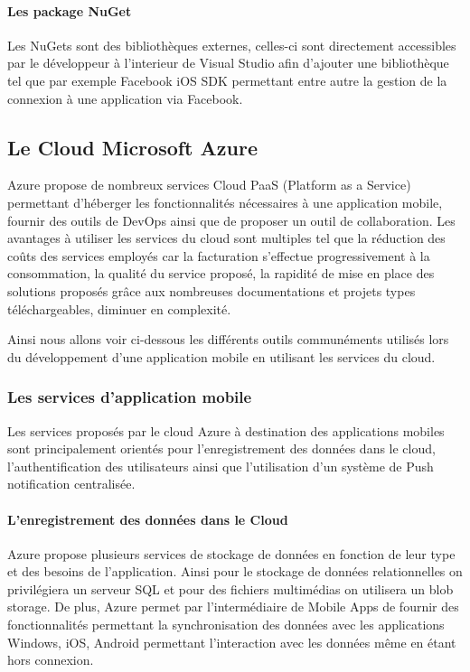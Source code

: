 \documentclass[11]{article}
\begin{document}
\paragraph{Les package NuGet}
Les NuGets sont des bibliothèques externes, celles-ci sont directement accessibles par le développeur à l’interieur de Visual Studio afin d’ajouter une bibliothèque tel que par exemple Facebook iOS SDK permettant entre autre la gestion de la connexion à une application via Facebook.





\subsection{Le Cloud Microsoft Azure}
Azure propose de nombreux services Cloud PaaS (Platform as a Service) permettant d’héberger les fonctionnalités nécessaires à une application mobile, fournir des outils de DevOps ainsi que de proposer un outil de collaboration. Les avantages à utiliser les services du cloud sont multiples tel que la réduction des coûts des services employés car la facturation s’effectue progressivement à la consommation, la qualité du service proposé, la rapidité de mise en place des solutions proposés grâce aux nombreuses documentations et projets types téléchargeables, diminuer en complexité. 
      
\vspace{0.5cm}
   
Ainsi nous allons voir ci-dessous les différents outils communéments utilisés lors du développement d’une application mobile en utilisant les services du cloud.


\subsubsection{Les services d'application mobile}
Les services proposés par le cloud Azure à destination des applications mobiles sont principalement orientés pour l’enregistrement des données dans le cloud, l’authentification des utilisateurs ainsi que l’utilisation d’un système de Push notification centralisée.
 
\paragraph{L’enregistrement des données dans le Cloud}
Azure propose plusieurs services de stockage de données en fonction de leur type et des besoins de l’application. Ainsi pour le stockage de données relationnelles on privilégiera un serveur SQL et pour des fichiers multimédias on utilisera un blob storage. 
De plus, Azure permet par l’intermédiaire de Mobile Apps de fournir des fonctionnalités permettant la synchronisation des données avec les applications Windows, iOS, Android permettant l’interaction avec les données même en étant hors connexion.
\end{document}
